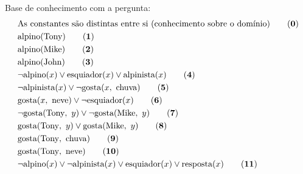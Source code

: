\documentclass[10pt, twoside]{article}          %
\newenvironment{proof*}[1][proof*]              %
  {\proof[#1]\vspace{0.5em}\vspace*{-\baselineskip}
  \hspace{\parindent}\leftskip=.5cm\rightskip=.5cm}
  {\vspace*{-1.5\baselineskip}
  
  \rightskip=0cm\endproof}
\begin{document}
\begin{multicols*}{2}
\begin{enumerate}
\begin{proof*}[\unskip\nopunct]
\begin{enumerate}
        Base de conhecimento com a pergunta:
        \begin{align*}
          & \text{As constantes são distintas entre si (conhecimento sobre o domínio)}              \tag{\textbf{0}}  \\
          & \text{alpino}(\text{Tony})                                                              \tag{\textbf{1}}  \\
          & \text{alpino}(\text{Mike})                                                              \tag{\textbf{2}}  \\
          & \text{alpino}(\text{John})                                                              \tag{\textbf{3}}  \\
          & \lnot\text{alpino}(x)\lor\text{esquiador}(x)\lor\text{alpinista}(x)                     \tag{\textbf{4}}  \\
          & \lnot\text{alpinista}(x)\lor\lnot\text{gosta}(x,\ \text{chuva})                         \tag{\textbf{5}}  \\
          & \text{gosta}(x,\ \text{neve})\lor\lnot\text{esquiador}(x)                               \tag{\textbf{6}}  \\
          & \lnot\text{gosta}(\text{Tony},\ y)\lor\lnot\text{gosta}(\text{Mike},\ y)                \tag{\textbf{7}}  \\
          & \text{gosta}(\text{Tony},\ y)\lor\text{gosta}(\text{Mike},\ y)                          \tag{\textbf{8}}  \\
          & \text{gosta}(\text{Tony},\ \text{chuva})                                                \tag{\textbf{9}}  \\
          & \text{gosta}(\text{Tony},\ \text{neve})                                                 \tag{\textbf{10}} \\
          & \lnot\text{alpino}(x)\lor\lnot\text{alpinista}(x)
            \lor\text{esquiador}(x)\lor\text{resposta}(x)                                           \tag{\textbf{11}} \\
        \end{align*}


\end{enumerate}
\end{proof*}
\end{enumerate}
\end{multicols*}
\end{document}
